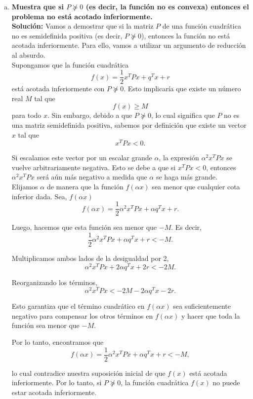 \begin{enumerate}
    \begin{enumerate}[(a)]

	\item \textbf{\boldmath Muestra que si $P \nsucceq 0$ (es decir, la función no es convexa) entonces el problema no está acotado inferiormente.}\\

	    \textbf{Solución:} Vamos a demostrar que si la matriz $P$ de una función cuadrática no es semidefinida positiva (es decir, $P\nsucceq0$), entonces la función no está acotada inferiormente. Para ello, vamos a utilizar un argumento de reducción al absurdo.\\

	    Supongamos que la función cuadrática 
	    $$f(x) = \frac{1}{2}x^TPx + q^Tx + r$$
	    está acotada inferiormente con $P \nsucceq 0$. Esto implicaría que existe un número real $M$ tal que 
	    $$f(x) \geq M$$ 
	    para todo $x$. Sin embargo, debido a que $P \nsucceq 0$, lo cual significa que $P$ no es una matriz semidefinida positiva, sabemos por definición que existe un vector $x$ tal que 
	    $$x^TPx < 0.$$

	    Si escalamos este vector por un escalar grande $\alpha$, la expresión $\alpha^2 x^TPx$ se vuelve arbitrariamente negativa. Esto se debe a que si $x^TPx < 0$, entonces $\alpha^2 x^TPx$ será aún más negativo a medida que $\alpha$ se haga más grande.\\

	    Elijamos $\alpha$ de manera que la función $f(\alpha x)$ sea menor que cualquier cota inferior dada. Sea, $f(\alpha x)$ 
	    $$f(\alpha x) = \frac{1}{2}\alpha^2 x^TPx + \alpha q^Tx + r.$$ 

	    Luego, hacemos que esta función sea menor que $-M$. Es decir, 
	    $$\frac{1}{2}\alpha^2 x^TPx + \alpha q^Tx + r < -M.$$ 

	    Multiplicamos ambos lados de la desigualdad por 2,
	    $$\alpha^2 x^TPx + 2\alpha q^Tx + 2r < -2M.$$ 

	    Reorganizando los términos,  
	    $$\alpha^2 x^TPx < -2M - 2\alpha q^Tx - 2r.$$ 

	    Esto garantiza que el término cuadrático en $f(\alpha x)$ sea suficientemente negativo para compensar los otros términos en $f(\alpha x)$ y hacer que toda la función sea menor que $-M$.

	    Por lo tanto, encontramos que 
	    $$f(\alpha x) = \frac{1}{2}\alpha^2 x^TPx + \alpha q^Tx + r < -M,$$

	    lo cual contradice nuestra suposición inicial de que $f(x)$ está acotada inferiormente. Por lo tanto, si $P \nsucceq 0$, la función cuadrática $f(x)$ no puede estar acotada inferiormente. \\\\


\end{enumerate}
\end{enumerate}
